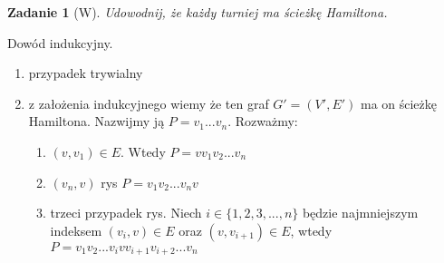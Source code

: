 \documentclass{mwbk}
\newtheorem{zad}{Zadanie}[chapter]
\begin{document}
\begin{zad}[W]
    Udowodnij, że każdy turniej ma ścieżkę Hamiltona.
\end{zad}
\begin{mdframed}
    Dowód indukcyjny.
    \begin{enumerate}
        \item przypadek trywialny
        \item z założenia indukcyjnego wiemy że ten graf $G' = (V', E')$ ma
              on ścieżkę Hamiltona. Nazwijmy ją $P = v_1 ... v_n$. Rozważmy:
              \begin{enumerate}
                  \item $(v, v_1) \in E$. Wtedy $P = v v_1 v_2 ... v_n$
                  \item $(v_n, v)$ rys $P = v_1 v_2 ... v_n v$
                  \item trzeci przypadek rys. Niech $i \in \{1, 2, 3, ..., n\}$
                        będzie najmniejszym indeksem $(v_i, v) \in E$ oraz $(v, v_{i+1}) \in E$,\newline
                        wtedy $P = v_1 v_2 ... v_i v v_{i+1} v_{i+2} ... v_n$
              \end{enumerate}
    \end{enumerate}
\end{mdframed}
\end{document}
